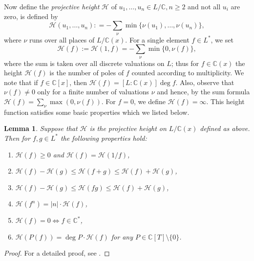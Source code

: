 \documentclass[12pt]{amsart}
\newtheorem{lemma}[theorem]{Lemma}
\newcommand{\C}{\mbox{$\mathbb C$}}     %
\begin{document}
      Now define the {\em projective height} $\mathcal{H}$ of $u_1, \ldots, u_n \in L/\C, n\geq 2$ and not all $u_i$ are zero, is defined by
	\begin{equation*}\label{eq1_1}
		\mathcal{H}(u_1, \ldots, u_n): = -\sum_{\nu} \min \{\nu(u_1), \ldots, \nu(u_n)\},
	\end{equation*}
	where $\nu$ runs over all places of $L/\C(x)$. For a single element $f\in L^{*}$, we set
	\begin{equation*}
		\mathcal{H}(f) :=\mathcal{H}(1, f)= -\sum_{\nu} \min \{0, \nu(f)\},
	\end{equation*}
	where the sum is taken over all discrete valuations on $L$; thus for $f\in \C(x)$ the height $\mathcal{H}(f)$ is the number of poles of $f$ counted according to multiplicity. We note that if $f\in \C[x]$, then $\mathcal{H}(f)  = [L:\C(x)]\deg f$.  Also, observe that $\nu(f) \neq 0$ only for a finite number of valuations $\nu$ and hence, by the sum formula $\mathcal{H}(f) = \sum_{\nu} \max (0, \nu(f))$. For $f = 0$, we define $\mathcal{H}(f) = \infty$. This height function satisfies some basic properties which we listed below.
	
	\begin{lemma}\label{lem1}
		Suppose that $\mathcal{H}$ is the projective height on $L/\C(x)$ defined as above. Then for $f, g\in L^{*}$ the following properties hold:
		\begin{enumerate}[label=(\alph*)]
			\item $\mathcal{H}(f) \geq 0$ and $\mathcal{H}(f) = \mathcal{H}(1/f)$,
			\item $\mathcal{H}(f) - \mathcal{H}(g) \leq \mathcal{H}(f+g)\leq \mathcal{H}(f) +\mathcal{H}(g)$,
			\item $\mathcal{H}(f) -\mathcal{H}(g) \leq \mathcal{H}(fg)\leq \mathcal{H}(f) +\mathcal{H}(g)$,
			\item $\mathcal{H}(f^n) = |n|\cdot \mathcal{H}(f)$,
			\item $\mathcal{H}(f)=0\iff f\in \C^{*}$,
			\item $\mathcal{H}(P(f)) = \deg P\cdot \mathcal{H}(f)$ for any $P\in \C[T]\setminus \{0\}$.         
		\end{enumerate}
	\end{lemma}
	\begin{proof}
		For a detailed proof, see \cite[Lemma 2]{fuchs2019decomposable}.
	\end{proof}
\end{document}
